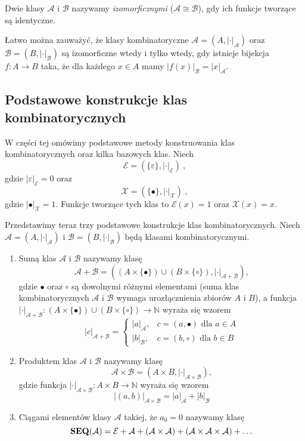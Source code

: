 \begin{definition}
    Dwie klasy $\mathcal{A}$ i $\mathcal{B}$ nazywamy \emph{izomorficznymi} ($\mathcal{A}\cong\mathcal{B}$), gdy ich funkcje tworzące są identyczne.
\end{definition}

Łatwo można zauważyć, że klasy kombinatoryczne $\mathcal{A}=(A,|\cdot|_{\mathcal{A}})$ oraz $\mathcal{B}=(B,|\cdot|_{\mathcal{B}})$ są izomorficzne wtedy i tylko wtedy, gdy istnieje bijekcja $f:A\to B$ taka, że dla każdego $x\in A$ mamy $|f(x)|_{\mathcal{B}} = |x|_{\mathcal{A}}$.


\subsection{Podstawowe konstrukcje klas kombinatorycznych}

W części tej omówimy podstawowe metody konstruowania klas kombinatorycznych oraz kilka bazowych klas. 
Niech 
$$\mathcal{E}=(\{\varepsilon\},|\cdot|_{\mathcal{E}})~,$$ 
gdzie $|\varepsilon|_{\mathcal{E}}=0$ oraz 
$$\mathcal{X}=(\{\bullet\},|\cdot|_{\mathcal{X}})~,$$ 
gdzie $|\bullet|_{\mathcal{X}}=1$. Funkcje tworzące tych klas to $\mathcal{E}(x)=1$ oraz $\mathcal{X}(x)=x$. 

Przedstawimy teraz trzy podstawowe konstrukcje klas kombinatorycznych.
Niech $\mathcal{A}=(A,|\cdot|_{\mathcal{A}})$ i $\mathcal{B}=(B,|\cdot|_{\mathcal{B}})$ będą klasami kombinatorycznymi. 
\begin{enumerate}
    \item Sumą klas $\mathcal{A}$ i $\mathcal{B}$ nazywamy klasę
    $$\mathcal{A}+\mathcal{B} = \left((A\times\{\bullet\})\cup (B\times\{\circ\}), |\cdot|_{\mathcal{A}+\mathcal{B}}\right),$$
    gdzie $\bullet$ oraz $\circ$ są dowolnymi różnymi elementami (suma klas kombinatorycznych $\mathcal{A}$ i $\mathcal{B}$ wymaga urozłącznienia zbiorów $A$ i $B$), a funkcja $|\cdot|_{\mathcal{A}+\mathcal{B}}:(A\times\{\bullet\})\cup (B\times\{\circ\}) \to \mathbb{N}$ wyraża się wzorem
    $$|c|_{\mathcal{A}+\mathcal{B}} = \left\{
    \begin{array}{rl}
        |a|_{\mathcal{A}}, & c=(a,\bullet) \text{ dla  } a \in A\\
        |b|_{\mathcal{B}}, & c=(b,\circ) \text{ dla } b \in B
    \end{array}
    \right.$$
    
    \item Produktem klas $\mathcal{A}$ i $\mathcal{B}$ nazywamy klasę 
    $$\mathcal{A}\times\mathcal{B} = (A\times B, |\cdot|_{\mathcal{A}\times\mathcal{B}}),$$
    gdzie funkcja $|\cdot|_{\mathcal{A}\times\mathcal{B}}:A\times B \to \mathbb{N}$ wyraża się wzorem
    $$|(a,b)|_{\mathcal{A}\times\mathcal{B}} = |a|_{\mathcal{A}}+|b|_{\mathcal{B}}$$
    
    \item Ciągami elementów klasy $\mathcal{A}$ takiej, że $a_0 = 0$ nazywamy klasę 
    $$\mathbf{SEQ}(\mathcal{A}) = \mathcal{E}+\mathcal{A}+(\mathcal{A}\times\mathcal{A})+(\mathcal{A}\times\mathcal{A}\times\mathcal{A})+\dots$$
\end{enumerate}

